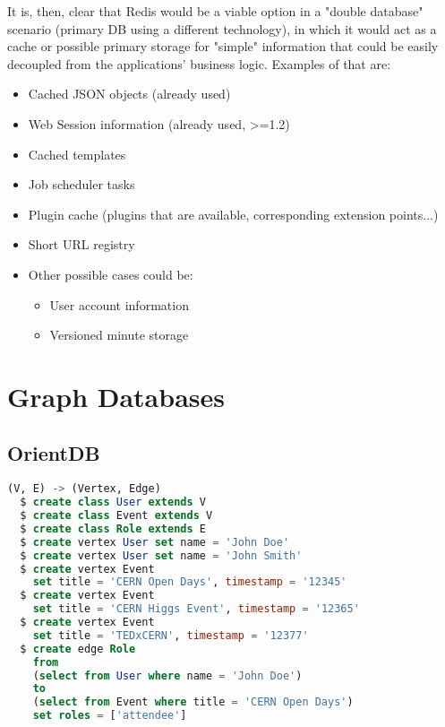 It is, then, clear that Redis would be a viable option in a "double database" scenario (primary DB using a different technology), in which it would act as a cache or possible primary storage for "simple" information that could be easily decoupled from the applications' business logic. Examples of that are:

\begin{itemize}
  \item Cached JSON objects (already used)
  \item Web Session information (already used, >=1.2)
  \item Cached templates
  \item Job scheduler tasks
  \item Plugin cache (plugins that are available, corresponding extension points...)
  \item Short URL registry
  \item Other possible cases could be:
  \begin{itemize}
    \item User account information
    \item Versioned minute storage
  \end{itemize}
\end{itemize}

\section{Graph Databases}

\subsection{OrientDB}

\begin{lstlisting}[language=SQL]
  (V, E) -> (Vertex, Edge)
  $ create class User extends V
  $ create class Event extends V
  $ create class Role extends E
  $ create vertex User set name = 'John Doe'
  $ create vertex User set name = 'John Smith'
  $ create vertex Event 
    set title = 'CERN Open Days', timestamp = '12345'
  $ create vertex Event
    set title = 'CERN Higgs Event', timestamp = '12365'
  $ create vertex Event
    set title = 'TEDxCERN', timestamp = '12377'
  $ create edge Role
    from
    (select from User where name = 'John Doe')
    to
    (select from Event where title = 'CERN Open Days')
    set roles = ['attendee']
\end{lstlisting}

